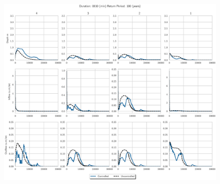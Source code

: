\begin{figure}
    \centering
    \includegraphics[width=\linewidth]{./RL-SI-figures/77storms/0010100.eps}
\end{figure}



